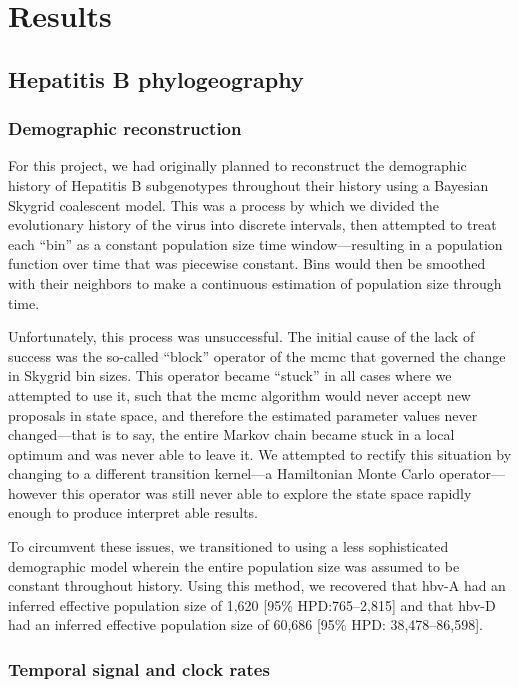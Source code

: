 \chapter{Results}\label{ch:results}

\section{Hepatitis B phylogeography}

\subsection{Demographic reconstruction}

For this project, we had originally planned to reconstruct the demographic history of Hepatitis B subgenotypes throughout their history using a Bayesian Skygrid coalescent model.
This was a process by which we divided the evolutionary history of the virus into discrete intervals, then attempted to treat each ``bin'' as a constant population size time window---resulting in a population function over time that was piecewise constant.
Bins would then be smoothed with their neighbors to make a continuous estimation of population size through time.

Unfortunately, this process was unsuccessful.
The initial cause of the lack of success was the so-called ``block'' operator of the \gls{mcmc} that governed the change in Skygrid bin sizes.
This operator became ``stuck'' in all cases where we attempted to use it, such that the \gls{mcmc} algorithm would never accept new proposals in state space, and therefore the estimated parameter values never changed---that is to say, the entire Markov chain became stuck in a local optimum and was never able to leave it.
We attempted to rectify this situation by changing to a different transition kernel---a Hamiltonian Monte Carlo operator---however this operator was still never able to explore the state space rapidly enough to produce interpret able results.

To circumvent these issues, we transitioned to using a less sophisticated demographic model wherein the entire population size was assumed to be constant throughout history.
Using this method, we recovered that \gls{hbv}-A had an inferred effective population size of 1,620 [95\% HPD:765--2,815] and that \gls{hbv}-D had an inferred effective population size of 60,686 [95\% HPD: 38,478--86,598].

\subsection{Temporal signal and clock rates}

